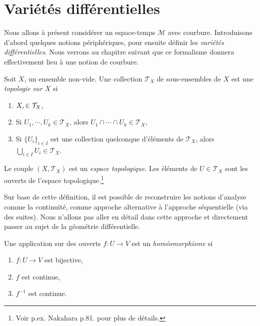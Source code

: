 \section{Variétés différentielles}
\label{sec:variétés}
Nous allons à présent considérer un espace-temps $\mathcal{M}$ avec courbure. Introduisons d'abord quelques notions périphériques, pour ensuite définir les \emph{variétés différentielles}. Nous verrons au chapitre suivant que ce formalisme donnera effectivement lieu à une notion de courbure.
\begin{theoremframe}
    \begin{defi}
        Soit $X$, un ensemble non-vide. Une collection $\mathcal{T}_X$ de sous-ensembles de $X$ est une \textit{topologie sur $X$} si
        \begin{enumerate}[label = \roman*.]
            \item $X,\empty \in \mathcal{T}_X$,
            \item Si $U_1,\cdots,U_k \in \mathcal{T}_X$, alors $U_1 \cap \cdots \cap U_k \in \mathcal{T}_X$,
            \item Si $\{ U_i\}_{i\in I}$ est une collection quelconque d'éléments de $\mathcal{T}_X$, alors $\bigcup_{i\in I} U_i \in \mathcal{T}_X$.
        \end{enumerate}
        Le couple $(X,\mathcal{T}_X)$ est un \textit{espace topologique}. Les éléments de $U\in \mathcal{T}_X$ sont les ouverts de l'espace topologique.\footnote{Voir p.ex. Nakahara p.81. pour plus de détails.}
    \end{defi}
\end{theoremframe}
Sur base de cette définition, il est possible de reconstruire les notions d'analyse comme la continuité, comme approche alternative à l'approche séquentielle (via des suites). Nous n'allons pas aller en détail dans cette approche et directement passer au sujet de la géométrie différentielle.
\begin{theoremframe}
    \begin{defi}
        Une application sur des ouverts $f:U\to V$ est un \emph{homéomorphisme} si
        \begin{enumerate}[label = \roman*.]
            \item $f:U\to V$ est bijective,
            \item $f$ est continue,
            \item $f^{-1}$ est continue.
        \end{enumerate} 
    \end{defi}
\end{theoremframe}
